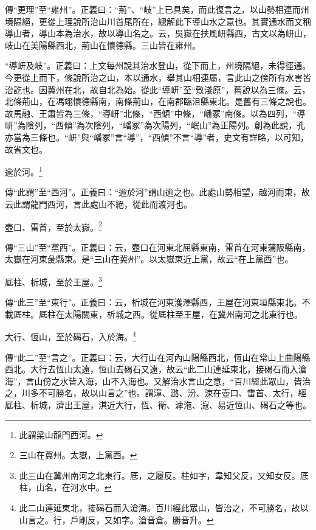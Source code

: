 {\noindent\zhuan{}\fzbyks 傳“更理”至“雍州”。正義曰：“荊”、“岐”上已具矣，而此復言之，以山勢相連而州境隔絕，更從上理說所治山川首尾所在，總解此下導山水之意也。其實通水而文稱導山者，導山本為治水，故以導山名之。云，吳嶽在扶風岍縣西，古文以為岍山，岐山在美陽縣西北，荊山在懷德縣。三山皆在雍州。 \par}

{\noindent\shu{}\fzkt “導岍及岐”。正義曰：上文每州說其治水登山，從下而上，州境隔絕，未得徑通。今更從上而下，條說所治之山，本以通水，舉其山相連屬，言此山之傍所有水害皆治訖也。因冀州在北，故自北為始。從此“導岍”至“敷淺原”，舊說以為三條。云，北條荊山，在馮翊懷德縣南，南條荊山，在南郡臨沮縣東北。是舊有三條之說也。故馬融、王肅皆為三條，“導岍”北條，“西傾”中條，“嶓冢”南條。以為四列，“導岍”為陰列，“西傾”為次陰列，“嶓冢”為次陽列，“岷山”為正陽列。創為此說，孔亦當為三條也。“岍”與“嶓冢”言“導”，“西傾”不言“導”者，史文有詳略，以可知，故省文也。 \par}

逾於河。\footnote{此謂梁山龍門西河。}

{\noindent\zhuan{}\fzbyks 傳“此謂”至“西河”。正義曰：“逾於河”謂山逾之也。此處山勢相望，越河而東，故云此謂龍門西河，言此處山不絕，從此而渡河也。 \par}

壺口、雷首，至於太嶽。\footnote{三山在冀州。太嶽，上黨西。}

{\noindent\zhuan{}\fzbyks 傳“三山”至“黨西”。正義曰：云，壺口在河東北屈縣東南，雷首在河東蒲阪縣南，太嶽在河東彘縣東。是“三山在冀州”。以太嶽東近上黨，故云“在上黨西”也。 \par}

厎柱、析城，至於王屋。\footnote{此三山在冀州南河之北東行。厎，之履反。柱如字，韋知父反，又知女反。厎柱，山名，在河水中。}

{\noindent\zhuan{}\fzbyks 傳“此三”至“東行”。正義曰：云，析城在河東濩澤縣西，王屋在河東垣縣東北。不載厎柱。厎柱在太陽關東，析城之西。從厎柱至王屋，在冀州南河之北東行也。 \par}

大行、恆山，至於碣石，入於海。\footnote{此二山連延東北，接碣石而入滄海。百川經此眾山，皆治之，不可勝名，故以山言之。行，戶剛反，又如字。滄音倉。勝音升。}

{\noindent\zhuan{}\fzbyks 傳“此二”至“言之”。正義曰：云，大行山在河內山陽縣西北，恆山在常山上曲陽縣西北。大行去恆山太遠，恆山去碣石又遠，故云“此二山連延東北，接碣石而入滄海”，言山傍之水皆入海，山不入海也。又解治水言山之意，“百川經此眾山，皆治之，川多不可勝名，故以山言之”也。謂漳、潞、汾、涑在壺口、雷首、太行，經厎柱、析城，濟出王屋，淇近大行，恆、衛、滹沲、滱、易近恆山、碣石之等也。 \par}

